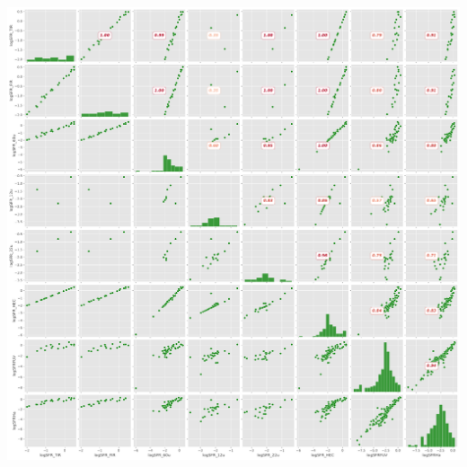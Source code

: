 \documentclass[
]{article}
\begin{document}
\includegraphics{compare_files/figure-pdf/cell-29-output-1.pdf}
\end{document}
